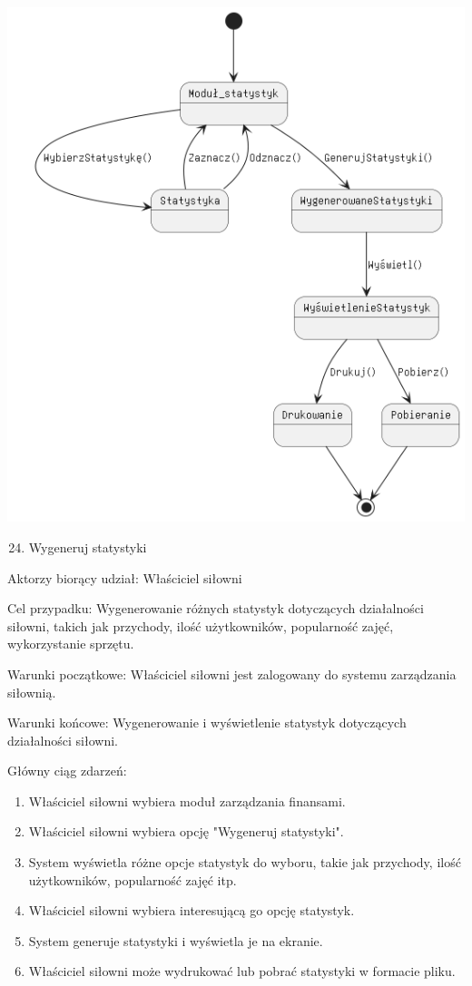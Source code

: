 {\includegraphics{../diagrams/state/wygeneruj_statystyki.png}}

\begin{enumerate}
\setcounter{enumi}{23}
\tightlist
\item
  {Wygeneruj statystyki}
\end{enumerate}

{Aktorzy biorący udział: Właściciel siłowni}

{Cel przypadku: Wygenerowanie różnych statystyk dotyczących działalności
siłowni, takich jak przychody, ilość użytkowników, popularność zajęć,
wykorzystanie sprzętu.}

{Warunki początkowe: Właściciel siłowni jest zalogowany do systemu
zarządzania siłownią.}

{Warunki końcowe: Wygenerowanie i wyświetlenie statystyk dotyczących
działalności siłowni.}

{Główny ciąg zdarzeń:}

\begin{enumerate}
\tightlist
\item
  {Właściciel siłowni wybiera moduł zarządzania finansami.}
\item
  {Właściciel siłowni wybiera opcję "Wygeneruj statystyki".}
\item
  {System wyświetla różne opcje statystyk do wyboru, takie jak
  przychody, ilość użytkowników, popularność zajęć itp.}
\item
  {Właściciel siłowni wybiera interesującą go opcję statystyk.}
\item
  {System generuje statystyki i wyświetla je na ekranie.}
\item
  {Właściciel siłowni może wydrukować lub pobrać statystyki w formacie
  pliku.}
\end{enumerate}

